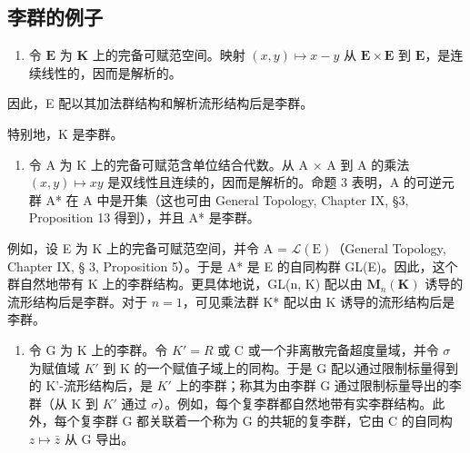 \subsection*{李群的例子}

\begin{enumerate}
\def\labelenumi{(\arabic{enumi})}
\tightlist
\item
  令 \(\mathbf{E}\) 为 \(\mathbf{K}\) 上的完备可赋范空间。映射 \((x, y) \mapsto x - y\) 从 \(\mathbf{E} \times \mathbf{E}\) 到 \(\mathbf{E}\)，是连续线性的，因而是解析的。
\end{enumerate}

因此，E 配以其加法群结构和解析流形结构后是李群。

特别地，K 是李群。

\begin{enumerate}
\def\labelenumi{(\arabic{enumi})}
\setcounter{enumi}{1}
\tightlist
\item
  令 A 为 K 上的完备可赋范含单位结合代数。从 A × A 到 A 的乘法 \((x,y)\mapsto xy\) 是双线性且连续的，因而是解析的。命题 3 表明，A 的可逆元群 A* 在 A 中是开集（这也可由 General Topology, Chapter IX, §3, Proposition 13 得到），并且 A* 是李群。
\end{enumerate}

例如，设 E 为 K 上的完备可赋范空间，并令 A = \(\mathcal{L}(\mathrm{E})\)（General Topology, Chapter IX, § 3, Proposition 5）。于是 A* 是 E 的自同构群 GL(E)。因此，这个群自然地带有 K 上的李群结构。更具体地说，GL(n, K) 配以由 \(\mathbf{M}_{n}(\mathbf{K})\) 诱导的流形结构后是李群。对于 \(n = 1\)，可见乘法群 K* 配以由 K 诱导的流形结构后是李群。

\begin{enumerate}
\def\labelenumi{(\arabic{enumi})}
\setcounter{enumi}{2}
\tightlist
\item
  令 G 为 K 上的李群。令 \(K' = R\) 或 C 或一个非离散完备超度量域，并令 \(\sigma\) 为赋值域 \(K'\) 到 K 的一个赋值子域上的同构。于是 G 配以通过限制标量得到的 K'-流形结构后，是 \(K'\) 上的李群；称其为由李群 G 通过限制标量导出的李群（从 K 到 \(K'\) 通过 \(\sigma\)）。例如，每个复李群都自然地带有实李群结构。此外，每个复李群 G 都关联着一个称为 G 的共轭的复李群，它由 C 的自同构 \(z \mapsto \bar{z}\) 从 G 导出。
\end{enumerate}

